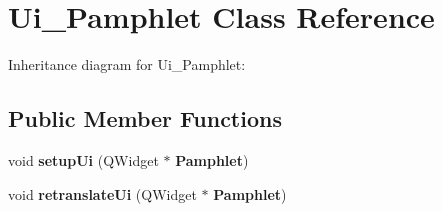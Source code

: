 \section{Ui\+\_\+\+Pamphlet Class Reference}
\label{class_ui___pamphlet}


Inheritance diagram for Ui\+\_\+\+Pamphlet\+:
\subsection*{Public Member Functions}
\begin{DoxyCompactItemize}
\item 
\mbox{\label{class_ui___pamphlet_aa43887aaeeab134e966ec920b9ee6db6}} 
void {\bfseries setup\+Ui} (Q\+Widget $\ast$\textbf{ Pamphlet})
\item 
\mbox{\label{class_ui___pamphlet_a83266ed1cd3bb9410918bbee8fde671e}} 
void {\bfseries retranslate\+Ui} (Q\+Widget $\ast$\textbf{ Pamphlet})
\end{DoxyCompactItemize}
